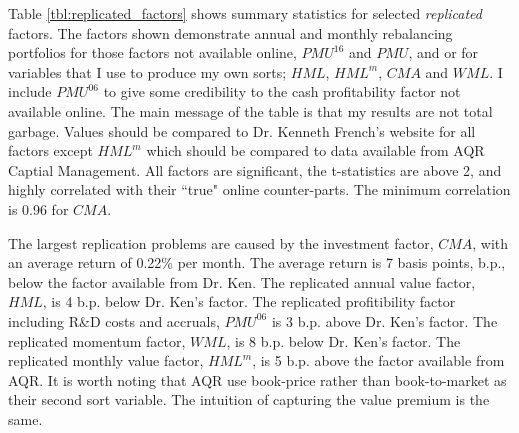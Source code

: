 
Table \ref{tbl:replicated_factors} shows summary statistics for selected \emph{replicated}
factors. The factors shown demonstrate annual and monthly rebalancing portfolios for those
factors not available online, $PMU^{16}$ and $PMU$, and  or for variables that I use to
produce my own sorts; $HML$, $HML^m$, $CMA$ and $WML$. I include $PMU^{06}$ to give some
credibility to the cash profitability factor not available online. The main message of the
table is that my results are not total garbage. Values should be compared to Dr. Kenneth
French's website for all factors except $HML^m$ which should be compared to data available
from AQR Captial Management. All factors are significant, the t-statistics are above 2,
and highly correlated with their ``true" online counter-parts. The minimum correlation is
0.96 for $CMA$.

The largest replication problems are caused by the investment factor, $CMA$, with an
average return of 0.22\% per month. The average return is 7 basis points, b.p., below the
factor available from Dr. Ken. The replicated annual value factor, $HML$, is 4 b.p. below
Dr. Ken's factor. The replicated profitibility factor including R\&D costs and accruals,
$PMU^{06}$ is 3 b.p. above Dr. Ken's factor. The replicated momentum factor, $WML$, is 8
b.p. below Dr. Ken's factor. The replicated monthly value factor, $HML^m$, is 5 b.p. above
the factor available from AQR. It is worth noting that AQR use book-price rather than
book-to-market as their second sort variable. The intuition of capturing the value
premium is the same.
